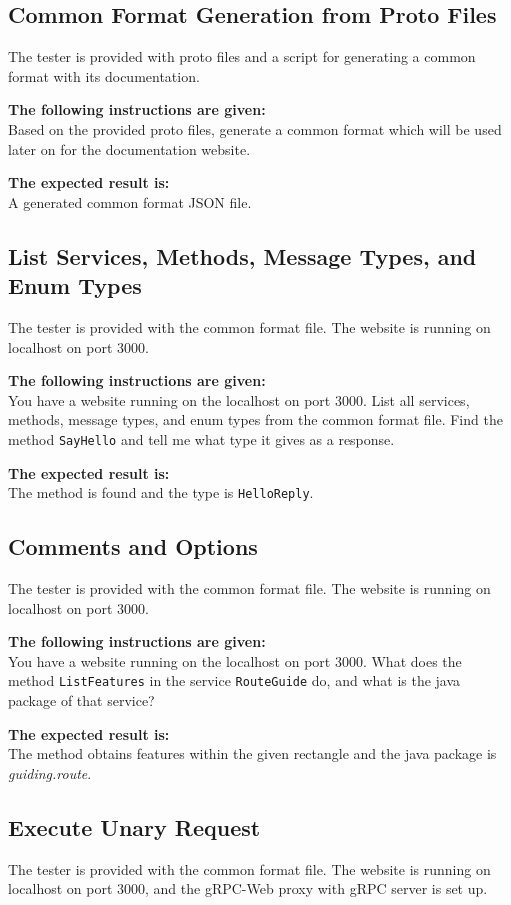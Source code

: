 \subsection{Common Format Generation from Proto Files}
The tester is provided with proto files and a script for generating a common format with its documentation.

\textbf{The following instructions are given:}\\
Based on the provided proto files, generate a common format which will be used later on for the documentation website.

\textbf{The expected result is:}\\
A generated common format JSON file.

\subsection{List Services, Methods, Message Types, and Enum Types}
The tester is provided with the common format file.
The website is running on localhost on port 3000.

\textbf{The following instructions are given:}\\
You have a website running on the localhost on port 3000.
List all services, methods, message types, and enum types from the common format file.
Find the method \texttt{SayHello} and tell me what type it gives as a response.

\textbf{The expected result is:}\\
The method is found and the type is \texttt{HelloReply}.

\subsection{Comments and Options}
The tester is provided with the common format file.
The website is running on localhost on port 3000.

\textbf{The following instructions are given:}\\
You have a website running on the localhost on port 3000.
What does the method \texttt{ListFeatures} in the service \texttt{RouteGuide} do, and what is the java package of that service?

\textbf{The expected result is:}\\
The method obtains features within the given rectangle and the java package is \textit{guiding.route}.

\subsection{Execute Unary Request}
The tester is provided with the common format file.
The website is running on localhost on port 3000, and the gRPC-Web proxy with gRPC server is set up.


